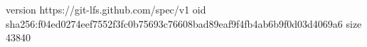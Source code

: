 version https://git-lfs.github.com/spec/v1
oid sha256:f04ed0274eef7552f3fc0b75693c76608bad89eaf9f4fb4ab6b9f0d03d4069a6
size 43840

